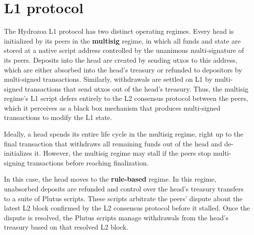 \documentclass[../hydrozoa.tex]{subfiles}
\begin{document}
\chapter{L1 protocol}%
\label{h:l1-protocol}

The Hydrozoa L1 protocol has two distinct operating regimes.
Every head is initialized by its peers in the \textbf{multisig} regime, in which all funds and state are stored at a native script address controlled by the unanimous multi-signature of its peers.
Deposits into the head are created by sending utxos to this address, which are either absorbed into the head's treasury or refunded to depositors by multi-signed transactions.
Similarly, withdrawals are settled on L1 by multi-signed transactions that send utxos out of the head's treasury.
Thus, the multisig regime's L1 script defers entirely to the L2 consensus protocol between the peers, which it perceives as a black box mechanism that produces multi-signed transactions to modify the L1 state.

Ideally, a head spends its entire life cycle in the multisig regime, right up to the final transaction that withdraws all remaining funds out of the head and de-initializes it.
However, the multisig regime may stall if the peers stop multi-signing transactions before reaching finalization.

In this case, the head moves to the \textbf{rule-based} regime.
In this regime, unabsorbed deposits are refunded and control over the head's treasury transfers to a suite of Plutus scripts. 
These scripts arbitrate the peers' dispute about the latest L2 block confirmed by the L2 consensus protocol before it stalled.
Once the dispute is resolved, the Plutus scripts manage withdrawals from the head's treasury based on that resolved L2 block.
\end{document}
